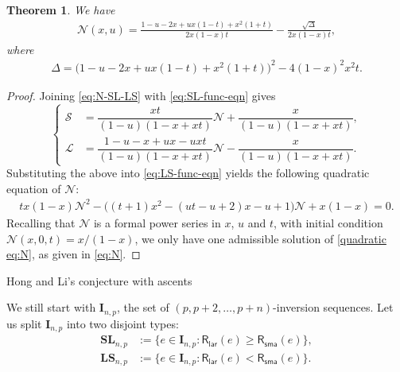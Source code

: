 \documentclass[reqno]{amsart}
\makeatletter
\numberwithin{equation}{section}
\theoremstyle{plain}
\newtheorem{theorem}{Theorem}[section]
\theoremstyle{definition}
\theoremstyle{named}
\def\section{\@startsection{section}{1}%
  \z@{.7\linespacing\@plus\linespacing}{.5\linespacing}%
  {\normalfont\scshape}}%
\newcommand{\bI}{\mathbf{I}}
\newcommand{\bSL}{\mathbf{SL}}
\newcommand{\bLS}{\mathbf{LS}}
\newcommand{\RLAR}{\mathsf{R}_{\mathsf{lar}}}
\newcommand{\RSMA}{\mathsf{R}_{\mathsf{sma}}}
\newcommand{\cN}{\mathcal{N}}
\newcommand{\cSL}{\mathcal{S}}
\newcommand{\cLS}{\mathcal{L}}
\makeatother
\begin{document}
\begin{theorem}
	We have
	\begin{align}\label{eq:N}
		\cN(x,u)=\frac{1-u-2x+ux(1-t)+x^2(1+t)}{2x(1-x)t}-\frac{\sqrt{\Delta}}{2x(1-x)t},
	\end{align}
	where
	\begin{align}
		\Delta=\big(1-u-2x+ux(1-t)+x^2(1+t)\big)^2-4(1-x)^2 x^2 t.
	\end{align}
\end{theorem}

\begin{proof}
	Joining \eqref{eq:N-SL-LS} with \eqref{eq:SL-func-eqn} gives
	\begin{equation*}
		\left\{
		\begin{aligned}
			\cSL&=\dfrac{xt}{(1-u)(1-x+xt)} \cN+\dfrac{x}{(1-u)(1-x+xt)},\\[12pt]
			\cLS&=\dfrac{1-u-x+ux-uxt}{(1-u)(1-x+xt)}\cN-\dfrac{x}{(1-u)(1-x+xt)}.
		\end{aligned}
		\right.
	\end{equation*}
	Substituting the above into \eqref{eq:LS-func-eqn} yields the following quadratic equation of $\cN$:
	\begin{align}\label{quadratic eq:N}
	tx(1-x)\cN^2-\big((t+1)x^2-(ut-u+2)x-u+1\big)\cN+x(1-x)=0.
	\end{align}
	Recalling that $\cN$ is a formal power series in $x$, $u$ and $t$, with initial condition $\cN(x,0,t)=x/(1-x)$, we only have one admissible solution of \eqref{quadratic eq:N}, as given in \eqref{eq:N}.
\end{proof}

\section{Hong and Li's conjecture with ascents}

We still start with $\bI_{n,p}$, the set of $(p,p+2,\ldots,p+n)$-inversion sequences. Let us split $\bI_{n,p}$ into two disjoint types:
\begin{align*}
	\bSL_{n,p}&:=\{e\in\bI_{n,p}:\RLAR(e)\ge \RSMA(e)\},\\
	\bLS_{n,p}&:=\{e\in\bI_{n,p}:\RLAR(e)< \RSMA(e)\}.
\end{align*}
\end{document}
